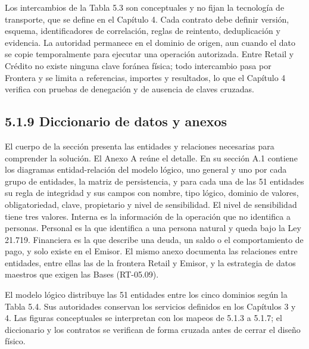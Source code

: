 \documentclass[11pt]{article}
\begin{document}
Los intercambios de la Tabla 5.3 son conceptuales y no fijan la tecnología de transporte, que se define en el Capítulo 4. Cada contrato debe definir versión, esquema, identificadores de correlación, reglas de reintento, deduplicación y evidencia. La autoridad permanece en el dominio de origen, aun cuando el dato se copie temporalmente para ejecutar una operación autorizada. Entre Retail y Crédito no existe ninguna clave foránea física; todo intercambio pasa por Frontera y se limita a referencias, importes y resultados, lo que el Capítulo 4 verifica con pruebas de denegación y de ausencia de claves cruzadas.

\subsection{5.1.9 Diccionario de datos y anexos}

El cuerpo de la sección presenta las entidades y relaciones necesarias para comprender la solución. El Anexo A reúne el detalle. En su sección A.1 contiene los diagramas entidad-relación del modelo lógico, uno general y uno por cada grupo de entidades, la matriz de persistencia, y para cada una de las 51 entidades su regla de integridad y sus campos con nombre, tipo lógico, dominio de valores, obligatoriedad, clave, propietario y nivel de sensibilidad. El nivel de sensibilidad tiene tres valores. Interna es la información de la operación que no identifica a personas. Personal es la que identifica a una persona natural y queda bajo la Ley 21.719. Financiera es la que describe una deuda, un saldo o el comportamiento de pago, y solo existe en el Emisor. El mismo anexo documenta las relaciones entre entidades, entre ellas las de la frontera Retail y Emisor, y la estrategia de datos maestros que exigen las Bases (RT-05.09).

El modelo lógico distribuye las 51 entidades entre los cinco dominios según la Tabla 5.4. Sus autoridades conservan los servicios definidos en los Capítulos 3 y 4. Las figuras conceptuales se interpretan con los mapeos de 5.1.3 a 5.1.7; el diccionario y los contratos se verifican de forma cruzada antes de cerrar el diseño físico.
\end{document}
